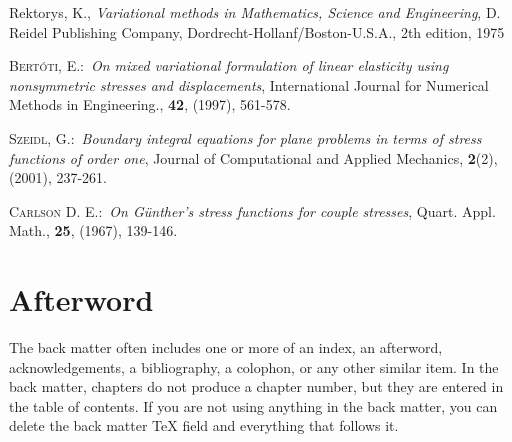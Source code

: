 \documentclass[letterpaper,12pt,openany,reqno]{book}%
\begin{document}
\begin{thebibliography}{9}
Rektorys, K., \textit{Variational methods in Mathematics,
Science and Engineering}, D. Reidel Publishing Company,
Dordrecht-Hollanf/Boston-U.S.A., 2th edition, 1975

 \textsc{Bert\'{o}ti, E.}:\ \textit{On mixed variational formulation
of linear elasticity using nonsymmetric stresses and displacements}, International
Journal for Numerical Methods in Engineering., \textbf{42}, (1997), 561-578.

 \textsc{Szeidl, G.}:\ \textit{Boundary integral equations for
plane problems in terms of stress functions of order one}, Journal of Computational and
Applied Mechanics, \textbf{2}(2), (2001), 237-261.

  \textsc{Carlson D. E.}:\ \textit{On G\"{u}nther's stress functions
for couple stresses}, Quart. Appl. Math., \textbf{25}, (1967), 139-146.
\end{thebibliography}

\backmatter

\chapter{Afterword}

The back matter often includes one or more of an index, an afterword,
acknowledgements, a bibliography, a colophon, or any other similar item. In
the back matter, chapters do not produce a chapter number, but they are
entered in the table of contents. If you are not using anything in the back
matter, you can delete the back matter TeX field and everything that follows it.
\end{document}
